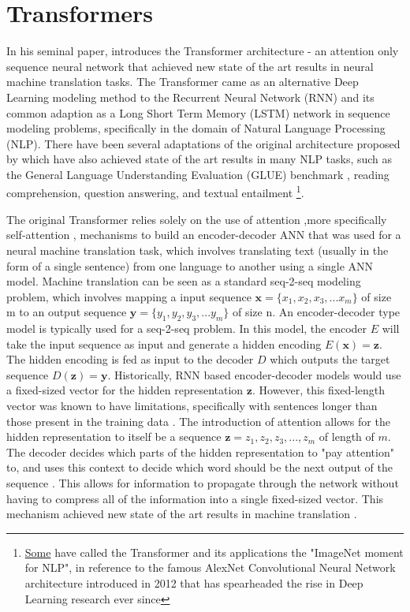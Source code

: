 \section{Transformers}
In his seminal paper, \citet{vaswani2017attention} introduces the Transformer architecture - an attention only sequence neural network that achieved new state of the art results in neural machine translation tasks. The Transformer came as an alternative Deep Learning modeling method to the Recurrent Neural Network (RNN) and its common adaption as a Long Short Term Memory (LSTM) network in sequence modeling problems, specifically in the domain of Natural Language Processing (NLP). There have been several adaptations of the original architecture proposed by \citet{vaswani2017attention} which have also achieved state of the art results in many NLP tasks, such as the General Language Understanding Evaluation (GLUE) benchmark \cite{devlin2018bert}\cite{wang2018glue}, reading comprehension, question answering, and textual entailment \cite{brown2020language} \footnote{\href{https://ruder.io/nlp-imagenet/}{Some} have called the Transformer and its applications the "ImageNet moment for NLP", in reference to the famous AlexNet Convolutional Neural Network architecture introduced in 2012 \cite{krizhevsky2017imagenet} that has spearheaded the rise in Deep Learning research ever since}. 

\newcommand{\mb}[1]{\mathbf{#1}}

The original Transformer relies solely on the use of attention \cite{bahdanau2014neural},more specifically self-attention , mechanisms to build an encoder-decoder ANN that was used for a neural machine translation task, which involves translating text (usually in the form of a single sentence) from one language to another using a single ANN model. Machine translation can be seen as a standard seq-2-seq modeling problem, which involves mapping a input sequence $\mb{x} = \{x_1, x_2, x_3,...x_m\}$ of size m to an output sequence $\mb{y} = \{y_1, y_2, y_3, ... y_m\}$ of size n. An encoder-decoder type model is typically used for a seq-2-seq problem. In this model, the encoder $E$ will take the input sequence as input and generate a hidden encoding $E(\mb{x}) = \mb{z}$. The hidden encoding is fed as input to the decoder $D$ which outputs the target sequence $D(\mb{z}) = \mb{y}$. Historically, RNN based encoder-decoder models would use a fixed-sized vector for the hidden representation $\mb{z}$. However, this fixed-length vector was known to have limitations, specifically with sentences longer than those present in the training data \cite{bahdanau2014neural}. The introduction of attention allows for the hidden representation to itself be a sequence $\mb{z} = {z_1, z_2, z_3, ..., z_m}$ of length of $m$. The decoder decides which parts of the hidden representation to "pay attention" to, and uses this context to decide which word should be the next output of the sequence \cite{bahdanau2014neural}. This allows for information to propagate through the network without having to compress all of the information into a single fixed-sized vector. This mechanism achieved new state of the art results in machine translation  . 

